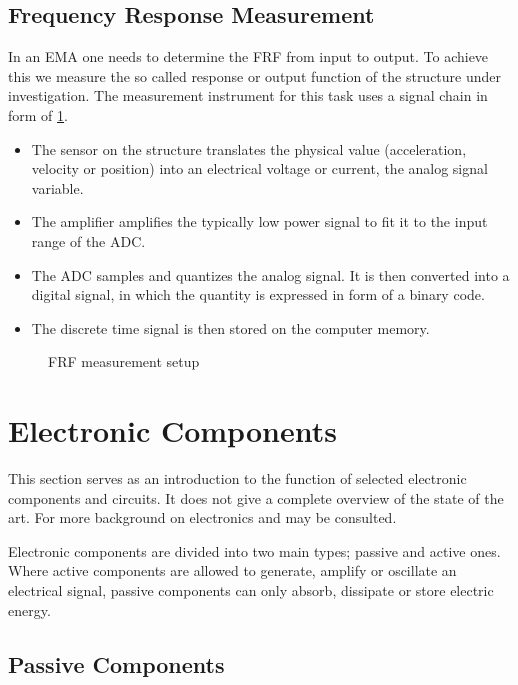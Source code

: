 \subsection{Frequency Response Measurement}

In an \ac{EMA} one needs to determine the \ac{FRF} from input to output. To achieve this we measure the so called response or output function of the structure under investigation. The measurement instrument for this task uses a signal chain in form of \ref{fig:measurement}.
\begin{itemize}
    \item The sensor on the structure translates the physical value (acceleration, velocity or position) into an electrical voltage or current, the analog signal variable.
    \item The amplifier amplifies the typically low power signal to fit it to the input range of the \ac{ADC}.
    \item The \ac{ADC} samples and quantizes the analog signal. It is then converted into a digital signal, in which the quantity is expressed in form of a binary code.
    \item The discrete time signal is then stored on the computer memory.
\end{itemize}
\cite{fu2001modal}

\begin{figure}[!htb]
    \centering
    
    \caption[Frequency Response Measurement]{\ac{FRF} measurement setup}
    \label{fig:measurement}
\end{figure}

\section{Electronic Components}

This section serves as an introduction to the function of selected electronic components and circuits. It does not give a complete overview of the state of the art. For more background on electronics \cite{Stiny2019AeB} and \cite{Tietze2008EC} may be consulted.

Electronic components are divided into two main types; passive and active ones. Where active components are allowed to generate, amplify or oscillate an electrical signal, passive components can only absorb, dissipate or store electric energy.

\subsection{Passive Components}

